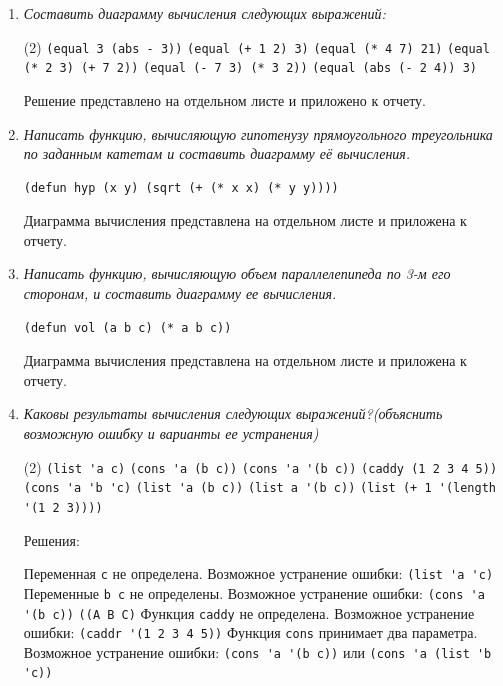 \documentclass[12pt]{report}
\begin{document}
\begin{enumerate}[wide=0pt]
\item \textit{Составить диаграмму вычисления следующих выражений:}
\begin{tasks}[label=\arabic*), item-indent=3pt, after-item-skip=1pt](2)
	\task \lstinline|(equal 3 (abs - 3))|
	\task \lstinline|(equal (+ 1 2) 3)|
	\task \lstinline|(equal (* 4 7) 21)|
	\task \lstinline|(equal (* 2 3) (+ 7 2))|
	\task \lstinline|(equal (- 7 3) (* 3 2))|
	\task \lstinline|(equal (abs (- 2 4)) 3)|
\end{tasks}
Решение представлено на отдельном листе и приложено к отчету.
\item \textit{Написать функцию, вычисляющую гипотенузу прямоугольного треугольника по заданным катетам и составить диаграмму её вычисления.}
\begin{lstlisting}
(defun hyp (x y) (sqrt (+ (* x x) (* y y))))
\end{lstlisting}
Диаграмма вычисления представлена на отдельном листе и приложена к отчету.
\item \textit{Написать функцию, вычисляющую объем параллелепипеда по 3-м его сторонам, и составить диаграмму ее вычисления.}
\begin{lstlisting}
(defun vol (a b c) (* a b c))
\end{lstlisting}
Диаграмма вычисления представлена на отдельном листе и приложена к отчету.
\item \textit{Каковы результаты вычисления следующих выражений?(объяснить возможную ошибку и
варианты ее устранения)}
\begin{tasks}[label=\arabic*), item-indent=3pt, after-item-skip=1pt](2)
	\task \lstinline|(list 'a c)|
	\task \lstinline|(cons 'a (b c))|
	\task \lstinline|(cons 'a '(b c))|
	\task \lstinline|(caddy (1 2 3 4 5))|
	\task \lstinline|(cons 'a 'b 'c)|
	\task \lstinline|(list 'a (b c))|
	\task \lstinline|(list a '(b c))|
	\task \lstinline|(list (+ 1 '(length '(1 2 3))))|
\end{tasks}
Решения:
\begin{tasks}[label=\arabic*), item-indent=3pt, after-item-skip=1pt]
	\task Переменная \lstinline|c| не определена. Возможное устранение ошибки: \lstinline|(list 'a 'c)|
	\task Переменные \lstinline|b c| не определены. Возможное устранение ошибки: \lstinline|(cons 'a '(b c))|
	\task \lstinline|((A B C)|
	\task Функция \lstinline|caddy| не определена. Возможное устранение ошибки: \lstinline|(caddr '(1 2 3 4 5))|
	\task Функция \lstinline|cons| принимает два параметра. Возможное устранение ошибки: \lstinline|(cons 'a '(b c))| или \lstinline|(cons 'a (list 'b 'c))|

\end{tasks}
\end{enumerate}
\end{document}
